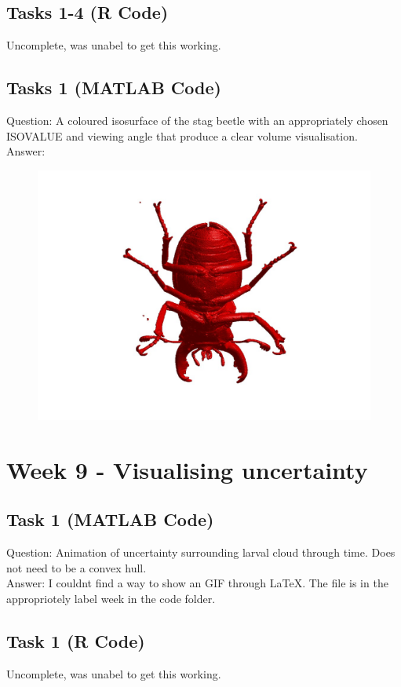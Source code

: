 \documentclass[12pt,a4paper]{report}
\begin{document}
\subsection{Tasks 1-4 (R Code)}
Uncomplete, was unabel to get this working.

\subsection{Tasks 1 (MATLAB Code)}
Question: A coloured isosurface of the stag beetle with an appropriately chosen ISOVALUE and viewing angle that
produce a clear volume visualisation.
\\
Answer:

\begin{figure}[H]
\centering
\includegraphics[width=\textwidth]{../Code/week 6/beetle.jpg} 
\end{figure}


\section{Week 9 - Visualising uncertainty}
\subsection{Task 1 (MATLAB Code)}
Question: Animation of uncertainty surrounding larval cloud through time. Does not need to be a convex hull.
\\
Answer: I couldnt find a way to show an GIF through LaTeX. The file is in the appropriotely label week in the code folder.

\subsection{Task 1 (R Code)}
Uncomplete, was unabel to get this working.
\end{document}
